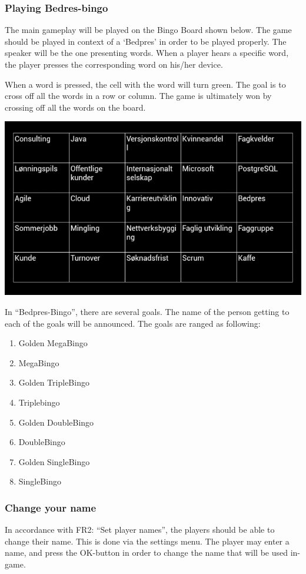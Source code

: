 \subsubsection{Playing Bedres-bingo}
The main gameplay will be played on the Bingo Board shown below. The game
should be played in context of a `Bedpres' in order to be played properly.
The speaker will be the one presenting words. When a player hears a specific
word, the player presses the corresponding word on his/her device.

When a word is pressed, the cell with the word will turn green. The goal is to
cross off all the words in a row or column. The game is ultimately won by
crossing off all the words on the board.

\begin{center}
\includegraphics[scale=0.6]{Pikks/maingame}
\end{center}

In ``Bedpres-Bingo'', there are several goals. The name of the person
getting to each of the goals will be announced.
The goals are ranged as following:
\begin{enumerate}
	\item{Golden MegaBingo}
	\item{MegaBingo}
	\item{Golden TripleBingo}
	\item{Triplebingo}
	\item{Golden DoubleBingo}
	\item{DoubleBingo}
	\item{Golden SingleBingo}
	\item{SingleBingo}
\end{enumerate}


\subsubsection{Change your name}
In accordance with FR2: ``Set player names'', the players should be able to
change their name. This is done via the settings menu. The player may enter a
name, and press the OK-button in order to change the name that will be used
in-game.

